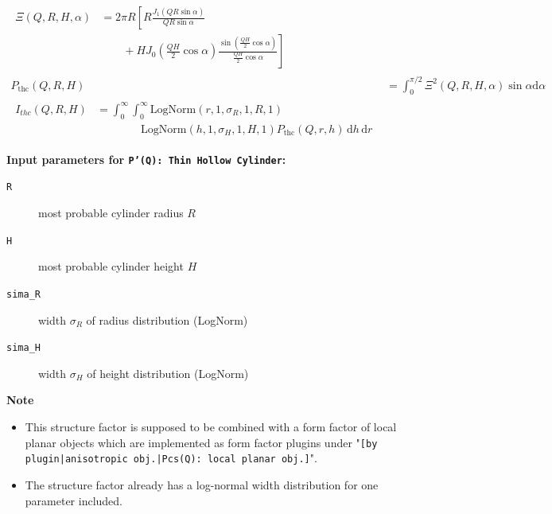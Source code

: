 \begin{align}
\begin{split}
\Xi(Q,R,H,\alpha) & = 2\pi R
\left[ R \frac{J_1\left(Q R \sin\alpha\right)}{Q R \sin\alpha} \right. \\
& \left. \quad \quad + H J_0\left( \frac{QH}{2} \cos\alpha\right)\frac{\sin\left(\frac{QH}{2} \cos\alpha\right)}{\frac{QH}{2} \cos\alpha} \right]
\end{split} \\
P_\text{thc}(Q,R,H) &= \int_0^{\pi/2} \Xi^2(Q,R,H,\alpha) \sin\alpha \mathrm{d}\alpha \\
\begin{split}
I_{thc}(Q,R,H) &= \int_0^\infty \int_0^\infty
\mathrm{LogNorm}(r,1,\sigma_R,1,R,1) \\
& \qquad \qquad  \mathrm{LogNorm}(h,1,\sigma_H,1,H,1) P_\text{thc}(Q,r,h)
\, \mathrm{d}h \, \mathrm{d}r
\end{split}
\end{align}

\noindent
\textbf{Input parameters for \texttt{P'(Q): Thin Hollow Cylinder}:}
\begin{description}
    \item[\texttt{R}] most probable cylinder radius $R$
    \item[\texttt{H}] most probable cylinder height $H$
    \item[\texttt{sima\_R}] width $\sigma_R$ of radius distribution (LogNorm)
    \item[\texttt{sima\_H}] width $\sigma_H$ of height distribution (LogNorm)
\end{description}

\noindent
\textbf{Note}
\begin{itemize}
  \item This structure factor is supposed to be combined with a form factor of local planar objects which are implemented as form factor plugins
under "\texttt{[by plugin|anisotropic obj.|Pcs(Q): local planar obj.]}".
\item The structure factor already has a log-normal width distribution for one parameter included.
\end{itemize}

